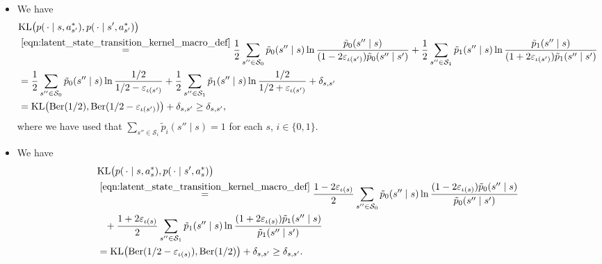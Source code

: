 \documentclass[11pt]{article}
\newcommand{\mcS}{\mathcal{S}}
\newcommand{\KL}{\textnormal{KL}}
\theoremstyle{definition}
\theoremstyle{definition}
\begin{document}
\begin{itemize}
	\item[$a=a^*_{s'}\neq a^*_s$.]
	      We have
	      \begin{align}
		       &
		      \KL\bigl(p(\,\cdot\mid  s,a^*_{s'}),p(\,\cdot\mid  s',a^*_{s'})\bigr)
		      \nonumber
		      \\
		       &
		      \overset{\eqref{eqn:latent_state_transition_kernel_macro_def}}{=}
		      \frac{1}{2}
		      \sum_{s''\in\mcS_0}
		      \tilde{p}_0(s'' \mid s)
		      \ln\frac{\tilde{p}_0(s'' \mid s)}{(1-2\varepsilon_{\iota(s')})\tilde{p}_0(s'' \mid s')}
		      \nonumber
		      +
		      \frac{1}{2}
		      \sum_{s''\in\mcS_1}
		      \tilde{p}_1(s'' \mid s)
		      \ln\frac{\tilde{p}_1(s'' \mid s)}{(1+2\varepsilon_{\iota(s')})\tilde{p}_1(s'' \mid s')}
		      \\
		       &
		      =
		      \frac{1}{2}
		      \sum_{s''\in\mcS_0}
		      \tilde{p}_0(s'' \mid s)
		      \ln\frac{1/2}{1/2-\varepsilon_{\iota(s')}}
		      +
		      \frac{1}{2}
		      \sum_{s''\in\mcS_1}
		      \tilde{p}_1(s'' \mid s)
		      \ln\frac{1/2}{1/2+\varepsilon_{\iota(s')}}
		      +
		      \delta_{s,s'}
		      \nonumber
		      \\
		       &
		      =
		      \KL
		      \bigl(
		      \mathrm{Ber}(1/2),\mathrm{Ber}(1/2-\varepsilon_{\iota(s')})
		      \bigr)
		      +
		      \delta_{s,s'}
		      \geq
		      \delta_{s,s'},
	      \end{align}
	      where we have used that $\sum_{s''\in\mcS_i}\tilde{p}_i(s'' \mid s)=1$ for each $s$, $i\in\{0,1\}$.

	\item[$a=a^*_s\neq a^*_{s'}$.]
	      We have
	      \begin{align}
		       &
		      \KL\bigl(p(\,\cdot\mid  s,a^*_{s}),p(\,\cdot\mid  s',a^*_{s})\bigr)
		      \nonumber
		      \\
		       &
		      \overset{\eqref{eqn:latent_state_transition_kernel_macro_def}}{=}
		      \frac{1-2\varepsilon_{\iota(s)}}{2}
		      \sum_{s''\in\mcS_0}
		      \tilde{p}_0(s'' \mid s)
		      \ln\frac{(1-2\varepsilon_{\iota(s)})\tilde{p}_0(s'' \mid s)}{\tilde{p}_0(s'' \mid s')}
		      \nonumber \\
		       &
		      \phantom{=} +
		      \frac{1+2\varepsilon_{\iota(s)}}{2}
		      \sum_{s''\in\mcS_1}
		      \tilde{p}_1(s'' \mid s)
		      \ln\frac{(1+2\varepsilon_{\iota(s)})\tilde{p}_1(s'' \mid s)}{\tilde{p}_1(s'' \mid s')}
		      \nonumber
		      \\
		       &
		      =
		      \mathrm{KL}\bigl(\mathrm{Ber}(1/2-\varepsilon_{\iota(s)}),\mathrm{Ber}(1/2)\bigr)
		      +
		      \delta_{s,s'}
		      \geq
		      \delta_{s,s'}.
	      \end{align}


\end{itemize}
\end{document}
